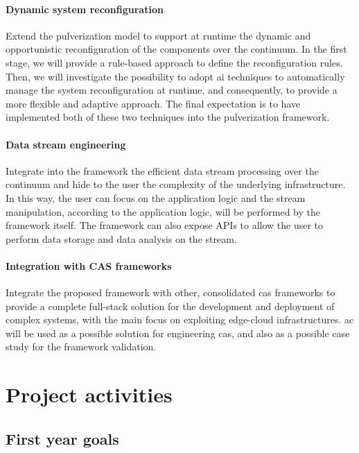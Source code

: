 \documentclass[12pt,a4paper]{article}
\newcommand{\meta}[1]{{\color{blue}#1}}
\begin{document}
\paragraph{Dynamic system reconfiguration}
Extend the pulverization model to support at runtime the dynamic and opportunistic reconfiguration of the components over the continuum.
%
In the first stage,
we will provide a rule-based approach to define the reconfiguration rules.
%
Then,
we will investigate the possibility to adopt \ac{ai} techniques to automatically manage the system reconfiguration at runtime,
and consequently,
to provide a more flexible and adaptive approach.
%
The final expectation is to have implemented both of these two techniques into the pulverization framework.

\paragraph{Data stream engineering}
\meta{
Integrate into the framework the efficient data stream processing over the continuum and hide to the user the complexity of the underlying infrastructure.
%
In this way,
the user can focus on the application logic and the stream manipulation,
according to the application logic,
will be performed by the framework itself.
%
The framework can also expose APIs to allow the user to perform data storage and data analysis on the stream.
}

\paragraph{Integration with CAS frameworks}
Integrate the proposed framework with other, consolidated \ac{cas} frameworks
to provide a complete full-stack solution for the development and deployment of complex systems,
with the main focus on exploiting edge-cloud infrastructures.
%
\ac{ac} will be used as a possible solution for engineering \ac{cas},
and also as a possible case study for the framework validation.


\section{Project activities}\label{sec:activities}

\subsection{First year goals}\label{subsec:first-year-activities}
\end{document}
